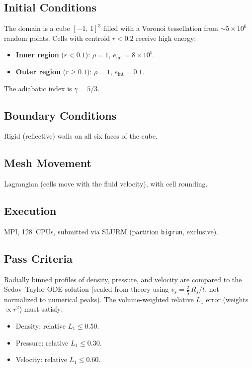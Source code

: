\documentclass[11pt,a4paper]{article}
\begin{document}
\subsection*{Initial Conditions}
The domain is a cube $[-1,\,1]^3$ filled with a Voronoi tessellation from $\sim\!5\times10^6$ random points. Cells with centroid $r < 0.2$ receive high energy:
\begin{itemize}
  \item \textbf{Inner region} ($r < 0.1$): $\rho = 1$, $e_{\mathrm{int}} = 8 \times 10^5$.
  \item \textbf{Outer region} ($r \ge 0.1$): $\rho = 1$, $e_{\mathrm{int}} = 0.1$.
\end{itemize}
The adiabatic index is $\gamma = 5/3$.

\subsection*{Boundary Conditions}
Rigid (reflective) walls on all six faces of the cube.

\subsection*{Mesh Movement}
Lagrangian (cells move with the fluid velocity), with cell rounding.

\subsection*{Execution}
MPI, 128~CPUs, submitted via SLURM (partition \texttt{bigrun}, exclusive).

\subsection*{Pass Criteria}
Radially binned profiles of density, pressure, and velocity are compared to the Sedov--Taylor ODE solution (scaled from theory using $v_s = \tfrac{2}{5}\,R_s/t$, not normalized to numerical peaks). The volume-weighted relative $L_1$ error (weights $\propto r^2$) must satisfy:
\begin{itemize}
  \item Density: relative $L_1 \le 0.50$.
  \item Pressure: relative $L_1 \le 0.30$.
  \item Velocity: relative $L_1 \le 0.60$.
\end{itemize}
\end{document}
